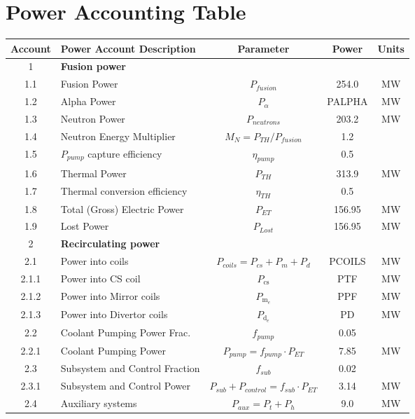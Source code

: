 
\newpage
\section{Power Accounting Table}

\begin{table}[ht!]								
\centering								
\begin{tabular}{|c|p{5cm}|c|c|c|}								
\hline								
\textbf{Account}	&	\textbf{Power Account Description}	&	\textbf{Parameter }	&	\textbf{Power}	&	\textbf{Units} \\
\hline								
1	&	\textbf{Fusion power}	&		&		&	\\
\hline
1.1	&	Fusion Power	&	$P_{{fusion}}$	&	254.0	&	MW \\
1.2	&	Alpha Power	&	$P_{{\alpha}}$	&	PALPHA	&	MW \\
1.3	&	Neutron Power	&	$P_{{neutrons}}$	&	203.2	&	MW \\
1.4	&	Neutron Energy Multiplier	&	$M_N = P_{{TH}}/P_{{fusion}}$	&	1.2	&	\\
1.5	&	$P_{pump}$ capture efficiency	&	$\eta_{{pump}}$	&	0.5	&	\\
1.6	&	Thermal Power	&	$P_{{TH}}$	&	313.9	&	MW \\
1.7	&	Thermal conversion efficiency	&	$\eta_{{TH}}$	&	0.5	&	\\
1.8	&	Total (Gross) Electric Power	&	$P_{{ET}}$	&	156.95	&	MW \\
1.9	&	Lost Power	&	$P_{{Lost}}$	&	156.95	&	MW \\
\hline								
2	&	\textbf{Recirculating power}	&		&		&	\\
\hline
2.1	&	Power into coils 	&	$P_{{coils}} = P_{{cs}} + P_{{m}}+ P_{{d}}$	&	PCOILS	&	MW \\
2.1.1 & Power into CS coil & $P_{\text{cs}}$ & PTF & MW \\
2.1.2 & Power into Mirror coils & $P_{\text{m}_e}$ & PPF & MW \\
2.1.3 & Power into Divertor coils & $P_{\text{d}_e}$ & PD & MW \\
2.2	&	Coolant Pumping Power Frac.	&	$f_{{pump}}$	&	0.05 &	\\
2.2.1	&	Coolant Pumping Power	&	$P_{{pump}} = f_{{pump}} \cdot P_{{ET}}$	&	7.85	&	MW \\
2.3	&	Subsystem and Control Fraction	&	$f_{{sub}}$	&	0.02	&	\\
2.3.1	&	Subsystem and Control Power	&	$P_{{sub}} + P_{{control}} = f_{{sub}} \cdot P_{{ET}}$	&	3.14	&	MW \\
2.4	&	Auxiliary systems	&	$P_{{aux}} = P_{{t}} + P_{{h}}$	&	9.0	&	MW \\

\end{tabular}
\end{table}
